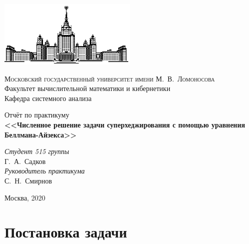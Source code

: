 \documentclass{article}
\begin{document}



\thispagestyle{empty}
\begin{center}
\vspace{-3cm}
\includegraphics[width=0.5\textwidth]{msu}\\
\begin{small}
{\scshape Московский государственный университет имени М.~В.~Ломоносова}\\
Факультет вычислительной математики и кибернетики\\
Кафедра системного анализа
\end{small}
\vfill
{\Large Отчёт по практикуму}\\
\vspace{1cm}
{\LARGE\bfseries <<Численное решение задачи суперхеджирования с помощью уравнения Беллмана-Айзекса>>}
\end{center}
\vspace{1cm}
\begin{flushright}



\textit{Студент 515 группы}\\
Г.~А.~Садков\\
\vspace{5mm}
\textit{Руководитель практикума}\\
С.~Н.~Смирнов
\end{flushright}
\vfill
\begin{center}
Москва, 2020
\end{center}
\pagebreak


\tableofcontents
\pagebreak


\section{Постановка задачи}
\end{document}
